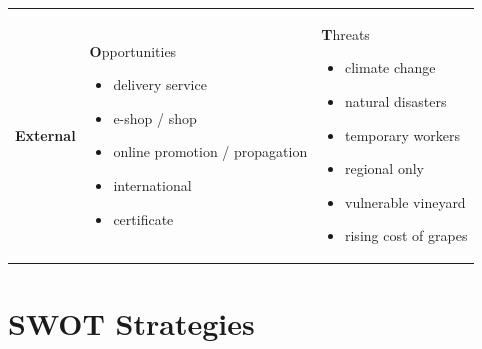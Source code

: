 \documentclass[11pt,a4paper]{article}
\begin{document}
\begin{table}[H]
\begin{center}
\begin{tabular}{r|p{}|p{}}
        \multirow{14}{*}[1em]{\textbf{\large{External}}}
        &
        \begin{center}
            \textbf{O}pportunities
        \end{center}
        \begin{itemize}
            \item delivery service
            \item e-shop / shop
            \item online promotion / propagation
            \item international
            \item certificate
        \end{itemize}
        &
        \begin{center}
            \textbf{T}hreats
        \end{center}
        \begin{itemize}
            \item climate change
            \item natural disasters
            \item temporary workers
            \item regional only
            \item vulnerable vineyard
            \item rising cost of grapes
        \end{itemize}
        \\
    \end{tabular}
  \end{center}
\end{table}

\newpage

\section*{SWOT Strategies}
\end{document}
